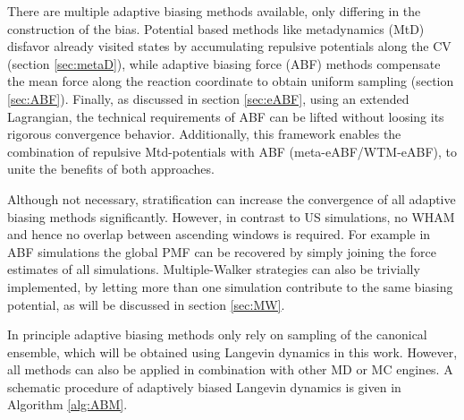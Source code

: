 There are multiple adaptive biasing methods available, only differing in the construction of the bias. Potential based methods like metadynamics (MtD) disfavor already visited states by accumulating repulsive potentials along the CV (section \ref{sec:metaD}), while adaptive biasing force (ABF) methods compensate the mean force along the reaction coordinate to obtain uniform sampling (section \ref{sec:ABF}). Finally, as discussed in section \ref{sec:eABF}, using an extended Lagrangian, the technical requirements of ABF can be lifted without loosing its rigorous convergence behavior.\autocite{lesage2017smoothed} Additionally, this framework enables the combination of repulsive Mtd-potentials with ABF (meta-eABF/WTM-eABF), to unite the benefits of both approaches.\autocite{fu2018zooming,fu2019taming}

Although not necessary, stratification can increase the convergence of all adaptive biasing methods significantly. However, in contrast to US simulations, no WHAM and hence no overlap between ascending windows is required. For example in ABF simulations the global PMF can be recovered by simply joining the force estimates of all simulations.\autocite{comer2015adaptive} Multiple-Walker strategies can also be trivially implemented, by letting more than one simulation contribute to the same biasing potential, as will be discussed in section \ref{sec:MW}.\autocite{minoukadeh2010potential}

In principle adaptive biasing methods only rely on sampling of the canonical ensemble, which will be obtained using Langevin dynamics in this work. However, all methods can also be applied in combination with other MD or MC engines. A schematic procedure of adaptively biased Langevin dynamics is given in Algorithm \ref{alg:ABM}.

